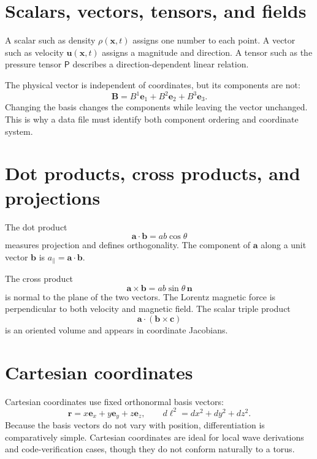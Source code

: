 \documentclass[11pt]{article}
\begin{document}
\section{Scalars, vectors, tensors, and fields}

A scalar such as density $\rho(\mathbf x,t)$ assigns one number to each point. A vector such as velocity $\mathbf u(\mathbf x,t)$ assigns a magnitude and direction. A tensor such as the pressure tensor $\mathsf P$ describes a direction-dependent linear relation.

The physical vector is independent of coordinates, but its components are not:
\begin{equation}
\mathbf B=B^1\mathbf e_1+B^2\mathbf e_2+B^3\mathbf e_3.
\end{equation}
Changing the basis changes the components while leaving the vector unchanged. This is why a data file must identify both component ordering and coordinate system.


\section{Dot products, cross products, and projections}

The dot product
\begin{equation}
\mathbf a\cdot\mathbf b=ab\cos\theta
\end{equation}
measures projection and defines orthogonality. The component of $\mathbf a$ along a unit vector $\mathbf b$ is $a_\parallel=\mathbf a\cdot\mathbf b$.

The cross product
\begin{equation}
\mathbf a\times\mathbf b=ab\sin\theta\,\mathbf n
\end{equation}
is normal to the plane of the two vectors. The Lorentz magnetic force is perpendicular to both velocity and magnetic field. The scalar triple product
\begin{equation}
\mathbf a\cdot(\mathbf b\times\mathbf c)
\end{equation}
is an oriented volume and appears in coordinate Jacobians.


\section{Cartesian coordinates}

Cartesian coordinates use fixed orthonormal basis vectors:
\begin{equation}
\mathbf r=x\mathbf e_x+y\mathbf e_y+z\mathbf e_z,
\qquad
d\ell^2=dx^2+dy^2+dz^2.
\end{equation}
Because the basis vectors do not vary with position, differentiation is comparatively simple. Cartesian coordinates are ideal for local wave derivations and code-verification cases, though they do not conform naturally to a torus.
\end{document}
